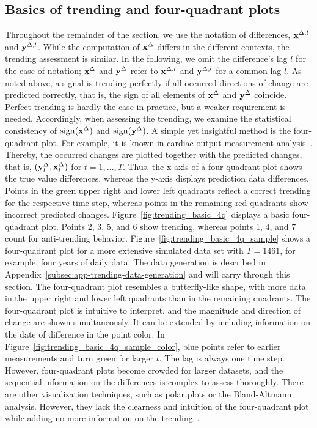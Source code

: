 \subsection{Basics of trending and four-quadrant plots}\label{subsec:trending-basics}

Throughout the remainder of the section, we use the notation of differences, $\mathbf{x}^{\Delta,l}$ and $\mathbf{y}^{\Delta,l}$.
While the computation of $\mathbf{x}^{\Delta}$ differs in the different contexts, the trending assessment is similar.
In the following, we omit the difference's lag $l$ for the ease of notation; $\mathbf{x}^{\Delta}$ and $\mathbf{y}^{\Delta}$ refer to $\mathbf{x}^{\Delta,l}$ and $\mathbf{y}^{\Delta,l}$ for a common lag $l$.
As noted above, a signal is trending perfectly if all occurred directions of change are predicted correctly, that is, the sign of all elements of $\mathbf{x}^{\Delta}$ and $\mathbf{y}^{\Delta}$ coincide.
Perfect trending is hardly the case in practice, but a weaker requirement is needed.
Accordingly, when assessing the trending, we examine the statistical consistency of $\operatorname{sign}(\mathbf{x}^{\Delta})$ and $\operatorname{sign}(\mathbf{y}^{\Delta})$.
A simple yet insightful method is the four-quadrant plot.
For example, it is known in cardiac output measurement analysis~\parencite{Saugel2015,perrino1998intraoperative}. 
Thereby, the occurred changes are plotted together with the predicted changes, that is, $(\mathbf{y}^{\Delta}_t, \mathbf{x}^{\Delta}_t)$ for $t = 1, \dots, T$.
Thus, the x-axis of a four-quadrant plot shows the true value differences, whereas the y-axis displays prediction data differences.
Points in the green upper right and lower left quadrants reflect a correct trending for the respective time step, whereas points in the remaining red quadrants show incorrect predicted changes.
Figure~\ref{fig:trending_basic_4q} displays a basic four-quadrant plot.
Points 2, 3, 5, and 6 show trending, whereas points 1, 4, and 7 count for anti-trending behavior.
Figure~\ref{fig:trending_basic_4q_sample} shows a four-quadrant plot for a more extensive simulated data set with $T=1461$, for example, four years of daily data.
The data generation is described in Appendix~\ref{subsec:app-trending-data-generation} and will carry through this section.
The four-quadrant plot resembles a butterfly-like shape, with more data in the upper right and lower left quadrants than in the remaining quadrants.
The four-quadrant plot is intuitive to interpret, and the magnitude and direction of change are shown simultaneously.
It can be extended by including information on the date of difference in the point color.
In Figure~\ref{fig:trending_basic_4q_sample_color}, blue points refer to earlier measurements and turn green for larger $t$.
The lag is always one time step.
However, four-quadrant plots become crowded for larger datasets, and the sequential information on the differences is complex to assess thoroughly.
There are other visualization techniques, such as polar plots or the Bland-Altmann analysis.
However, they lack the clearness and intuition of the four-quadrant plot while adding no more information on the trending~\parencite{Saugel2015}.

